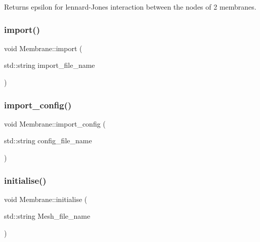 Returns epsilon for lennard-\/\+Jones interaction between the nodes of 2 membranes. \mbox{\label{classMembrane_ab235205040b763fa4c5045eddacf8034}} 
\subsubsection{\texorpdfstring{import()}{import()}}
{\footnotesize\ttfamily void Membrane\+::import (\begin{DoxyParamCaption}\item[{std\+::string}]{import\+\_\+file\+\_\+name }\end{DoxyParamCaption})}

\mbox{\label{classMembrane_aa332912bee38f3a4a0c45261ffbc497f}} 
\subsubsection{\texorpdfstring{import\_config()}{import\_config()}}
{\footnotesize\ttfamily void Membrane\+::import\+\_\+config (\begin{DoxyParamCaption}\item[{std\+::string}]{config\+\_\+file\+\_\+name }\end{DoxyParamCaption})}

\mbox{\label{classMembrane_ad0a4afaf92d04e327cb74cc5cad2ef7b}} 
\subsubsection{\texorpdfstring{initialise()}{initialise()}}
{\footnotesize\ttfamily void Membrane\+::initialise (\begin{DoxyParamCaption}\item[{std\+::string}]{Mesh\+\_\+file\+\_\+name }\end{DoxyParamCaption})}

\mbox{\label{classMembrane_a8ffb572d8b3b2cf07b2cb5e487fbc3b9}} 
